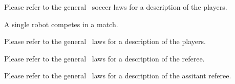\documentclass[12pt]{hurocup}
\begin{document}

Please refer to the general \HuroCup\ soccer laws for a description of
the players.


\begin{lawlist}[PK]
\item A single robot competes in a match.
\end{lawlist}


Please refer to the general \HuroCup\ laws for a description of
the players.


Please refer to the general \HuroCup\ laws for a description of
the referee.


Please refer to the general \HuroCup\ laws for a description of
the assitant referee.
 
\end{document}
